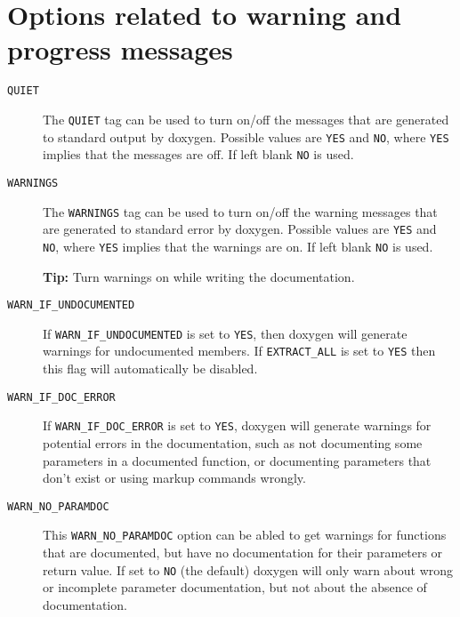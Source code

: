 \hypertarget{config_messages_input}{}\section{Options related to warning and progress messages}\label{config_messages_input}
\label{config_cfg_quiet}
\hypertarget{config_cfg_quiet}{}
 \begin{description}
\item[{\tt QUIET} ] The {\tt QUIET} tag can be used to turn on/off the messages that are generated to standard output by doxygen. Possible values are {\tt YES} and {\tt NO}, where {\tt YES} implies that the messages are off. If left blank {\tt NO} is used.

\label{config_cfg_warnings}
\hypertarget{config_cfg_warnings}{}
 \item[{\tt WARNINGS} ] The {\tt WARNINGS} tag can be used to turn on/off the warning messages that are generated to standard error by doxygen. Possible values are {\tt YES} and {\tt NO}, where {\tt YES} implies that the warnings are on. If left blank {\tt NO} is used.

{\bf Tip:} Turn warnings on while writing the documentation.

\label{config_cfg_warn_if_undocumented}
\hypertarget{config_cfg_warn_if_undocumented}{}
 \item[{\tt WARN\_\-IF\_\-UNDOCUMENTED} ] If {\tt WARN\_\-IF\_\-UNDOCUMENTED} is set to {\tt YES}, then doxygen will generate warnings for undocumented members. If {\tt EXTRACT\_\-ALL} is set to {\tt YES} then this flag will automatically be disabled.

\label{config_cfg_warn_if_doc_error}
\hypertarget{config_cfg_warn_if_doc_error}{}
 \item[{\tt WARN\_\-IF\_\-DOC\_\-ERROR} ] If {\tt WARN\_\-IF\_\-DOC\_\-ERROR} is set to {\tt YES}, doxygen will generate warnings for potential errors in the documentation, such as not documenting some parameters in a documented function, or documenting parameters that don't exist or using markup commands wrongly.

\label{config_cfg_warn_no_paramdoc}
\hypertarget{config_cfg_warn_no_paramdoc}{}
 \item[{\tt WARN\_\-NO\_\-PARAMDOC} ] This {\tt WARN\_\-NO\_\-PARAMDOC} option can be abled to get warnings for functions that are documented, but have no documentation for their parameters or return value. If set to {\tt NO} (the default) doxygen will only warn about wrong or incomplete parameter documentation, but not about the absence of documentation.


\end{description}
